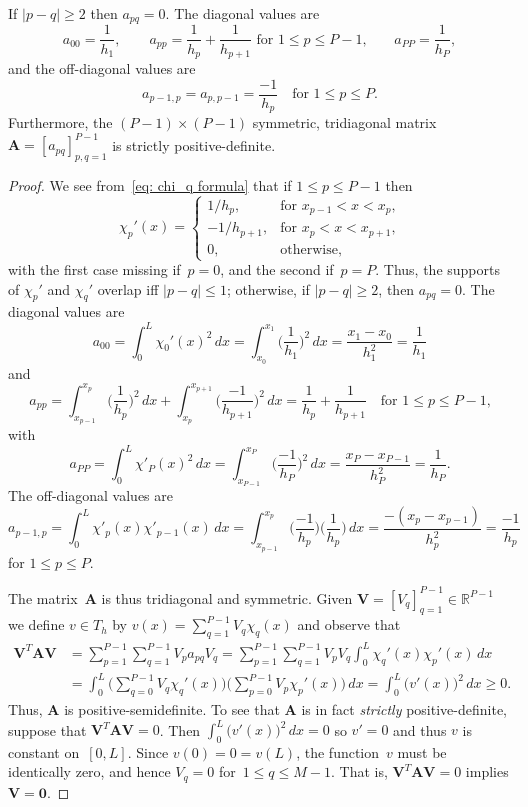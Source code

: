 \begin{theorem}
If $|p-q|\ge2$ then $a_{pq}=0$.  The diagonal values are
\[
a_{00}=\frac{1}{h_1},\qquad
\text{$a_{pp}=\frac{1}{h_p}+\frac{1}{h_{p+1}}$ for $1\le p\le P-1$,}\qquad
a_{PP}=\frac{1}{h_P},
\]
and the off-diagonal values are
\[
a_{p-1,p}=a_{p,p-1}=\frac{-1}{h_p}\quad\text{for $1\le p\le P$.}
\]
Furthermore, the $(P-1)\times(P-1)$ symmetric, tridiagonal 
matrix~$\boldsymbol{A}=[a_{pq}]_{p,q=1}^{P-1}$ is strictly positive-definite.
\end{theorem}
\begin{proof}
We see from~\eqref{eq: chi_q formula} that if $1\le p\le P-1$ then
\[
\chi_p'(x)=\begin{cases}
1/h_p,&\text{for $x_{p-1}<x<x_p$,}\\
-1/h_{p+1},&\text{for $x_p<x<x_{p+1}$,}\\
0,&\text{otherwise,}
\end{cases}
\]
with the first case missing if~$p=0$, and the second if~$p=P$.  Thus,
the supports of $\chi_p'$ and $\chi_q'$ overlap iff $|p-q|\le1$; otherwise,
if $|p-q|\ge2$, then $a_{pq}=0$. The diagonal values are
\[
a_{00}=\int_0^L\chi_0'(x)^2\,dx
    =\int_{x_0}^{x_1}\biggl(\frac{1}{h_1}\biggr)^2\,dx
    =\frac{x_1-x_0}{h_1^2}=\frac{1}{h_1}
\]
and
\[
a_{pp}=\int_{x_{p-1}}^{x_p}\biggl(\frac{1}{h_p}\biggr)^2\,dx
      +\int_{x_p}^{x_{p+1}}\biggl(\frac{-1}{h_{p+1}}\biggr)^2\,dx
        =\frac{1}{h_p}+\frac{1}{h_{p+1}}
\quad\text{for $1\le p\le P-1$,}
\]
with
\[
a_{PP}=\int_0^L\chi'_P(x)^2\,dx
    =\int_{x_{P-1}}^{x_P}\biggl(\frac{-1}{h_P}\biggr)^2\,dx
    =\frac{x_P-x_{P-1}}{h_P^2}=\frac{1}{h_P}.
\]
The off-diagonal values are
\[
a_{p-1,p}=\int_0^L\chi'_p(x)\chi'_{p-1}(x)\,dx
    =\int_{x_{p-1}}^{x_p}\biggl(\frac{-1}{h_p}\biggr)
    \biggl(\frac{1}{h_p}\biggr)\,dx=\frac{-(x_p-x_{p-1})}{h_p^2}=\frac{-1}{h_p}
\]
for $1\le p\le P$. 

The matrix~$\boldsymbol{A}$ is thus tridiagonal and symmetric.  Given
$\boldsymbol{V}=[V_q]_{q=1}^{P-1}\in\mathbb{R}^{P-1}$
we define $v\in T_h$ by $v(x)=\sum_{q=1}^{P-1}V_q\chi_q(x)$ and observe that
\begin{align*}
\boldsymbol{V}^T\boldsymbol{A}\boldsymbol{V}
    &=\sum_{p=1}^{P-1}\sum_{q=1}^{P-1}V_pa_{pq}V_q
    =\sum_{p=1}^{P-1}\sum_{q=1}^{P-1}V_pV_q\int_0^L\chi_q'(x)\chi_p'(x)\,dx\\
    &=\int_0^L\biggl(\sum_{q=0}^{P-1}V_q\chi_q'(x)\biggr)
             \biggl(\sum_{p=0}^{P-1}V_p\chi_p'(x)\biggr)\,dx
    =\int_0^L\bigl(v'(x)\bigr)^2\,dx\ge0.
\end{align*}
Thus, $\boldsymbol{A}$ is positive-semidefinite.  To see that
$\boldsymbol{A}$ is in fact \emph{strictly} positive-definite, suppose that
$\boldsymbol{V}^T\boldsymbol{A}\boldsymbol{V}=0$. Then 
$\int_0^L\bigl(v'(x)\bigr)^2\,dx=0$ so $v'=0$ and thus $v$ is constant 
on~$[0,L]$. Since $v(0)=0=v(L)$, the function~$v$ must be identically zero, 
and hence $V_q=0$ for~$1\le q\le M-1$.   That is, 
$\boldsymbol{V}^T\boldsymbol{A}\boldsymbol{V}=0$ implies 
$\boldsymbol{V}=\boldsymbol{0}$.
\end{proof}

